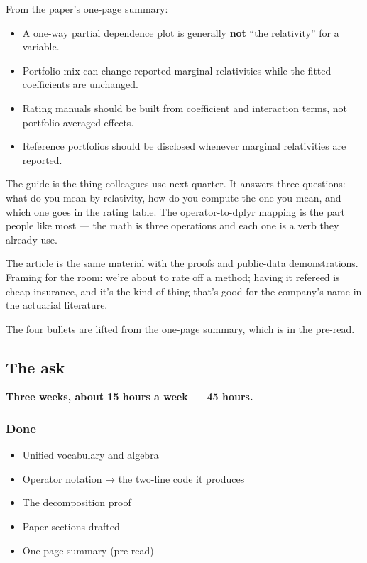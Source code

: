 \documentclass[
  letterpaper,
  DIV=11,
  numbers=noendperiod]{scrartcl}
\providecommand{\tightlist}{%
  \setlength{\itemsep}{0pt}\setlength{\parskip}{0pt}}
\begin{document}
From the paper's one-page summary:

\begin{itemize}
\tightlist
\item
  A one-way partial dependence plot is generally \textbf{not} ``the
  relativity'' for a variable.
\item
  Portfolio mix can change reported marginal relativities while the
  fitted coefficients are unchanged.
\item
  Rating manuals should be built from coefficient and interaction terms,
  not portfolio-averaged effects.
\item
  Reference portfolios should be disclosed whenever marginal
  relativities are reported.
\end{itemize}

The guide is the thing colleagues use next quarter. It answers three
questions: what do you mean by relativity, how do you compute the one
you mean, and which one goes in the rating table. The operator-to-dplyr
mapping is the part people like most --- the math is three operations
and each one is a verb they already use.

The article is the same material with the proofs and public-data
demonstrations. Framing for the room: we're about to rate off a method;
having it refereed is cheap insurance, and it's the kind of thing that's
good for the company's name in the actuarial literature.

The four bullets are lifted from the one-page summary, which is in the
pre-read.

\subsection{The ask}\label{ask}

\textbf{Three weeks, about 15 hours a week --- 45 hours.}

\subsubsection{Done}\label{done}

\begin{itemize}
\tightlist
\item
  Unified vocabulary and algebra
\item
  Operator notation → the two-line code it produces
\item
  The decomposition proof
\item
  Paper sections drafted
\item
  One-page summary (pre-read)
\end{itemize}
\end{document}
